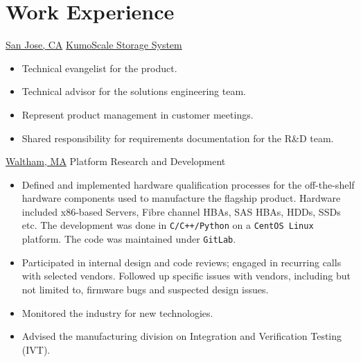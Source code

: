 \newcommand{\emc}{\href{https://en.wikipedia.org/wiki/Dell_EMC}{EMC Corporation}}
\newcommand{\hopkinton}{\href{https://www.hopkintonma.gov/}{Hopkinton, MA}}
\newcommand{\evanston}{\href{https://www.cityofevanston.org/}{Evanston, IL}}
\newcommand{\syracuse}{\href{http://www.syrgov.net}{Syracuse, NY}}
\newcommand{\northwestern}{\href{https://www.northwestern.edu/}{Northwestern University}}
\newcommand{\suniv}{\href{https://www.syracuse.edu/}{Syracuse University}}

\section{Work Experience}

{\href{https://www.sanjoseca.gov/}{San Jose, CA}} {\href{https://kumoscale.kioxia.com/en/}{KumoScale Storage System}}
{
	\begin{itemize}
		\item Technical evangelist for the product.
		\item Technical advisor for the solutions engineering team.
		\item Represent product management in customer meetings.
		\item Shared responsibility for requirements documentation for the R\&D team.
	\end{itemize}
}
{\href{https://www.city.waltham.ma.us/}{Waltham, MA}} {Platform Research and Development}
{
	\begin{itemize}
		\item Defined and implemented hardware qualification processes for the
			off-the-shelf hardware components used to manufacture the flagship
			product. Hardware included x86-based Servers, Fibre channel HBAs,
			SAS HBAs, HDDs, SSDs etc.  The development was done in \texttt{C/C++/Python}
			on a \texttt{CentOS Linux} platform. The code was maintained under \texttt{GitLab}.
		\item Participated in internal design and code reviews; engaged in
			recurring calls with selected vendors. Followed up specific issues 
			with vendors, including but not limited to, firmware bugs and
			suspected design issues.
		\item  Monitored the industry for new technologies.
		\item Advised the manufacturing division on Integration and Verification Testing (IVT).
	\end{itemize}
}

